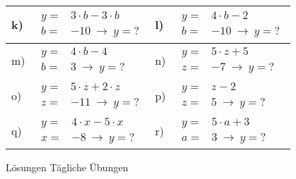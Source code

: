\documentclass[12pt]{article}
\begin{document}
\begin{xltabular}{\textwidth}{|C{0.75cm}|X|C{0.75cm}|X|}
k)&$\begin{aligned}
y=&3 \cdot b - 3 \cdot b\\
 b=&-10~ \rightarrow ~ y=?
\end{aligned}$
&
l)&$\begin{aligned}
y=&4 \cdot b - 2\\
 b=&-10~ \rightarrow ~ y=?
\end{aligned}$
\\\hline
m)&$\begin{aligned}
y=&4 \cdot b - 4\\
 b=&3~ \rightarrow ~ y=?
\end{aligned}$
&
n)&$\begin{aligned}
y=&5 \cdot z + 5\\
 z=&-7~ \rightarrow ~ y=?
\end{aligned}$
\\\hline
o)&$\begin{aligned}
y=&5 \cdot z + 2 \cdot z\\
 z=&-11~ \rightarrow ~ y=?
\end{aligned}$
&
p)&$\begin{aligned}
y=&z - 2\\
 z=&5~ \rightarrow ~ y=?
\end{aligned}$
\\\hline
q)&$\begin{aligned}
y=&4 \cdot x - 5 \cdot x\\
 x=&-8~ \rightarrow ~ y=?
\end{aligned}$
&
r)&$\begin{aligned}
y=&5 \cdot a + 3\\
 a=&3~ \rightarrow ~ y=?
\end{aligned}$
\\\hline
\end{xltabular}
\vspace{0.5cm}
\newpage
{}
\centerline{{\large Lösungen Tägliche Übungen}} 
\vspace{0.5cm}
\end{document}
